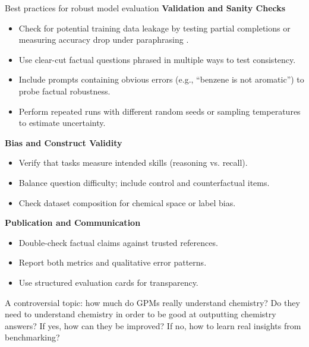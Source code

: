 \begin{reply}
\begin{examplebox}[label={example:best_practices}]{Best practices for robust model evaluation}
\textbf{Validation and Sanity Checks}
\begin{itemize}
    \item Check for potential training data leakage by testing partial completions or measuring accuracy drop under paraphrasing \autocite{duarte2024detecting}.
    \item Use clear-cut factual questions phrased in multiple ways to test consistency.
    \item Include prompts containing obvious errors (e.g., “benzene is not aromatic”) to probe factual robustness.
    \item Perform repeated runs with different random seeds or sampling temperatures to estimate uncertainty.
\end{itemize}


\textbf{Bias and Construct Validity}
\begin{itemize}
    \item Verify that tasks measure intended skills (reasoning vs. recall).
    \item Balance question difficulty; include control and counterfactual items.
    \item Check dataset composition for chemical space or label bias.
\end{itemize}

\textbf{Publication and Communication}
\begin{itemize}
    \item Double-check factual claims against trusted references.
    \item Report both metrics and qualitative error patterns.
    \item Use structured evaluation cards \autocite{alampara2025lessons} for transparency.
\end{itemize}
\end{examplebox}




\end{reply}

\begin{point}
A controversial topic: how much do GPMs really understand chemistry? Do they need to understand chemistry in order to be good at outputting chemistry answers? If yes, how can they be improved? If no, how to learn real insights from benchmarking?
\end{point}

